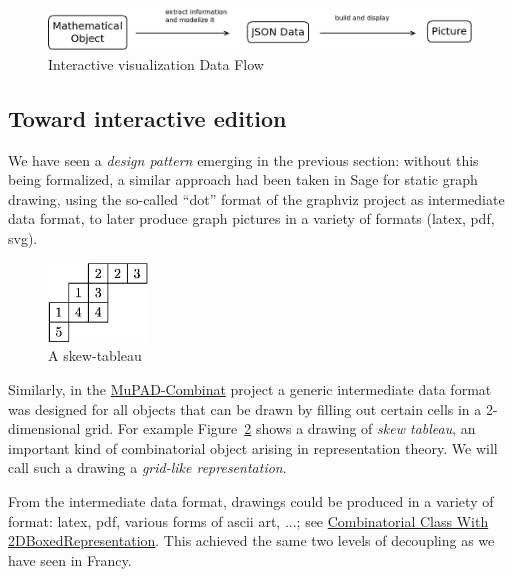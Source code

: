 \documentclass{deliverablereport}
\begin{document}
\begin{figure}[h]
  \begin{center}
    \includegraphics[width=\textwidth]{schemas/SensUnique}
  \end{center}
  \caption{Interactive visualization Data Flow}
  \label{fig:dataflow1}
\end{figure}




\subsection{Toward interactive edition}
\label{section:editing}

We have seen a \emph{design pattern} emerging in the previous section:
without this being formalized, a similar approach had been taken in
Sage for static graph drawing, using the so-called ``dot'' format of
the graphviz project as intermediate data format, to later produce
graph pictures in a variety of formats (latex, pdf, svg).

\begin{figure}
  \includegraphics[width=100px]{images/JDTSlide}
  \caption{A skew-tableau}
  \label{fig:skew_tableau}
\end{figure}
Similarly, in the
\href{http://mupad-combinat.sourceforge.net}{MuPAD-Combinat} project a
generic intermediate data format was designed for all objects that can
be drawn by filling out certain cells in a 2-dimensional grid. For
example Figure~\ref{fig:skew_tableau} shows a drawing of \emph{skew
  tableau}, an important kind of combinatorial object arising in
representation theory.
We will call such a drawing a \emph{grid-like representation}.


From the intermediate data format, drawings could be produced in a
variety of format: latex, pdf, various forms of ascii art, ...; see
\href{http://mupad-combinat.sourceforge.net/doc/en/Cat_Combinat/CombinatorialClassWith2DBoxedRepresentation.html}{Combinatorial Class With 2DBoxedRepresentation}.
This achieved the same two levels of decoupling as we have seen in Francy.
\end{document}

